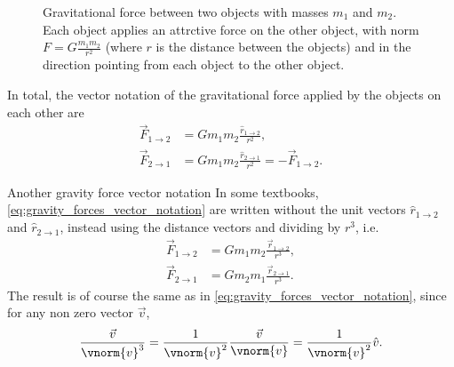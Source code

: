 \begin{figure}
  \begin{center}
  \end{center}
  \caption{Gravitational force between two objects with masses $m_{1}$ and $m_{2}$. Each object applies an attrctive force on the other object, with norm $F=G\frac{m_{1}m_{2}}{r^{2}}$ (where $r$ is the distance between the objects) and in the direction pointing from each object to the other object.}
  \label{fig:gravity_basics}
\end{figure}

In total, the vector notation of the gravitational force applied by the objects on each other are
\begin{align}
  \vec{F}_{1\to2} &= Gm_{1}m_{2}\frac{\hat{r}_{1\to2}}{r^{2}}\nonumber,\\
  \vec{F}_{2\to1} &= Gm_{1}m_{2}\frac{\hat{r}_{2\to1}}{r^{2}} = -\vec{F}_{1\to2}.
  \label{eq:gravity_forces_vector_notation}
\end{align}

\begin{note}{Another gravity force vector notation}{}
  In some textbooks, \autoref{eq:gravity_forces_vector_notation} are written without the unit vectors $\hat{r}_{1\to2}$ and $\hat{r}_{2\to1}$, instead using the distance vectors and dividing by $r^{3}$, i.e.
  \begin{align*}
    \vec{F}_{1\to2} &= Gm_{1}m_{2}\frac{\vec{r}_{1\to2}}{r^{3}},\\
    \vec{F}_{2\to1} &= Gm_{2}m_{1}\frac{\vec{r}_{2\to1}}{r^{3}}.
  \end{align*}
  The result is of course the same as in \autoref{eq:gravity_forces_vector_notation}, since for any non zero vector $\vec{v}$,
  \begin{align*}
    \frac{\vec{v}}{\vnorm{v}^{3}} = \frac{1}{\vnorm{v}^{2}}\frac{\vec{v}}{\vnorm{v}} = \frac{1}{\vnorm{v}^{2}}\hat{v}.
  \end{align*}
\end{note}

